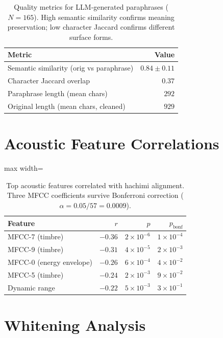 \documentclass[11pt]{article}
\begin{document}
\begin{table}[!h]
\centering
\caption{Quality metrics for LLM-generated paraphrases ($N{=}165$). High semantic similarity confirms meaning preservation; low character Jaccard confirms different surface forms.}
\label{tab:paraphrase_quality}
\small
\begin{tabular}{l r}
\toprule
\textbf{Metric} & \textbf{Value} \\
\midrule
Semantic similarity (orig vs paraphrase) & $0.84 \pm 0.11$ \\
Character Jaccard overlap & $0.37$ \\
Paraphrase length (mean chars) & $292$ \\
Original length (mean chars, cleaned) & $929$ \\
\bottomrule
\end{tabular}
\end{table}

\section{Acoustic Feature Correlations}\label{app:acoustic}

\begin{table}[!h]
\centering
\caption{Top acoustic features correlated with hachimi alignment. Three MFCC coefficients survive Bonferroni correction ($\alpha{=}0.05/57{=}0.0009$).}
\label{tab:acoustic_full}
\small
\begin{adjustbox}{max width=\columnwidth}
\begin{tabular}{l r r r}
\toprule
\textbf{Feature} & $r$ & $p$ & $p_{\text{bonf}}$ \\
\midrule
MFCC-7 (timbre)          & $-0.36$ & $2 \times 10^{-6}$ & $1 \times 10^{-4}$ \\
MFCC-9 (timbre)          & $-0.31$ & $4 \times 10^{-5}$ & $2 \times 10^{-3}$ \\
MFCC-0 (energy envelope) & $-0.26$ & $6 \times 10^{-4}$ & $4 \times 10^{-2}$ \\
MFCC-5 (timbre)          & $-0.24$ & $2 \times 10^{-3}$ & $9 \times 10^{-2}$ \\
Dynamic range            & $-0.22$ & $5 \times 10^{-3}$ & $3 \times 10^{-1}$ \\
\bottomrule
\end{tabular}
\end{adjustbox}
\end{table}

\section{Whitening Analysis}\label{app:whitening}
\end{document}
